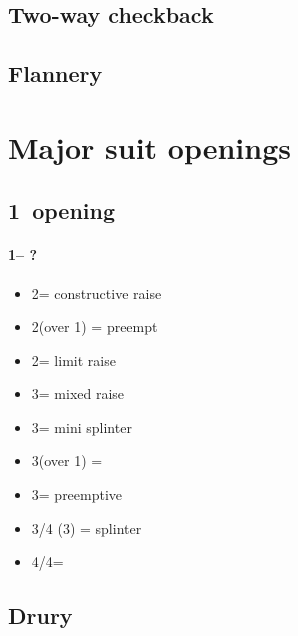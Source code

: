 \documentclass[12pt, a4paper]{report}
\begin{document}
\section*{\colorbox{blue!30}{Two-way checkback}}

\section*{\colorbox{blue!30}{Flannery}}

\chapter*{\colorbox{Plum!30}{Major suit openings}}

\section*{\colorbox{blue!30}{1\major\ opening}}
 {
    \subsubsection*{1\major -- ?}
    \begin{itemize}
        \item 2\major = constructive raise
        \item 2\spades (over 1\hearts) = preempt
        \item 2\nt = limit raise
        \item 3\clubs = mixed raise
        \item 3\diams = mini splinter
        \item 3\hearts (over 1\spades) = \nat\ \inv
        \item 3\major = preemptive
        \item 3\nt/4 (3\spades) = splinter
        \item 4\diams/4\hearts = \major
    \end{itemize}
}

\section*{\colorbox{blue!30}{Drury}}
\end{document}
